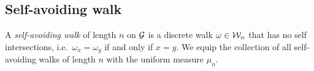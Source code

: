 
\begin{example}
\end{example}


\subsection{Self-avoiding walk}

A \emph{self-avoiding walk} of length $n$ on $\mathcal{G}$ is a discrete walk $\omega\in\mathcal{W}_n$ that has no self intersections, i.e.\ $\omega_x = \omega_y$ if and only if $x = y$. We equip the collection of all self-avoiding walks of length $n$ with the uniform measure $\mu_n$.

